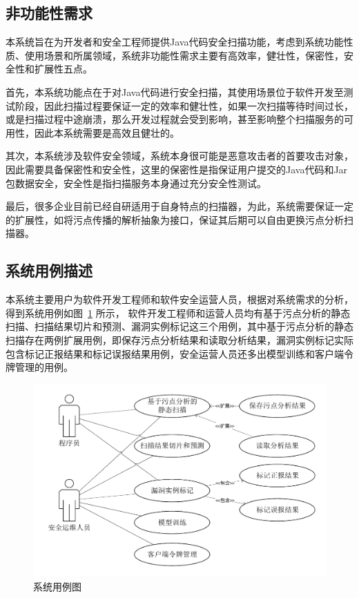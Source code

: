 \subsection{非功能性需求}
本系统旨在为开发者和安全工程师提供Java代码安全扫描功能，考虑到系统功能性质、使用场景和所属领域，系统非功能性需求主要有高效率，健壮性，保密性，安全性和扩展性五点。

首先，本系统功能点在于对Java代码进行安全扫描，其使用场景位于软件开发至测试阶段，因此扫描过程要保证一定的效率和健壮性，如果一次扫描等待时间过长，或是扫描过程中途崩溃，那么开发过程就会受到影响，甚至影响整个扫描服务的可用性，因此本系统需要是高效且健壮的。

其次，本系统涉及软件安全领域，系统本身很可能是恶意攻击者的首要攻击对象，因此需要具备保密性和安全性，这里的保密性是指保证用户提交的Java代码和Jar包数据安全，安全性是指扫描服务本身通过充分安全性测试。

最后，很多企业目前已经自研适用于自身特点的扫描器，为此，系统需要保证一定的扩展性，如将污点传播的解析抽象为接口，保证其后期可以自由更换污点分析扫描器。

\subsection{系统用例描述}\label{sec:case}
本系统主要用户为软件开发工程师和软件安全运营人员，根据对系统需求的分析，得到系统用例如图~\ref{fig:case} 所示， 软件开发工程师和运营人员均有基于污点分析的静态扫描、扫描结果切片和预测、漏洞实例标记这三个用例，其中基于污点分析的静态扫描存在两例扩展用例，即保存污点分析结果和读取分析结果，漏洞实例标记实际包含标记正报结果和标记误报结果用例，安全运营人员还多出模型训练和客户端令牌管理的用例。

\begin{figure}[!htbp]
	\centering
	\includegraphics[width=5in]{FIGs/chapter3/case.pdf}
	\caption{系统用例图}\label{fig:case}
\end{figure}

